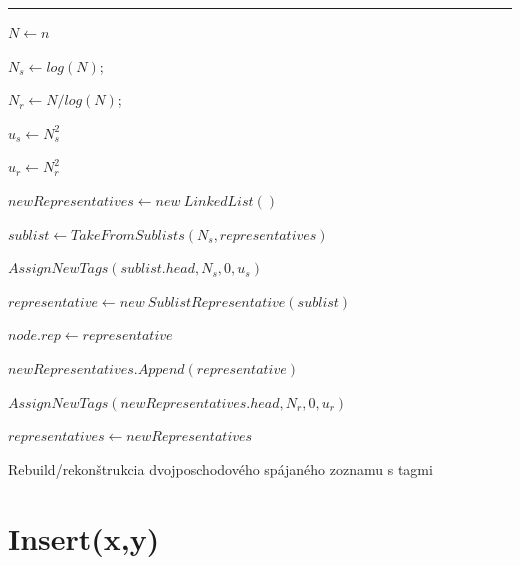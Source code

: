 \documentclass[
  digital,     %
  oneside,     %
  nosansbold,  %
  nocolorbold, %
  lof,         %
  lot,         %
]{fithesis4}
\begin{document}
\begin{algorithm}
\hrule\vspace{0.2em}
$N \leftarrow n$\;

$N_s \leftarrow log(N)$; 

$N_r \leftarrow N/log(N)$; 

$u_s \leftarrow N_s^2$\;

$u_r \leftarrow N_r^2$\;

$newRepresentatives \leftarrow new~LinkedList()$\;

{
    $sublist \leftarrow TakeFromSublists(N_s, representatives)$\;
    

    $AssignNewTags(sublist.head, N_s, 0, u_s)$\;
    
    $representative \leftarrow new~SublistRepresentative(sublist)$\;

    {
        $node.rep \leftarrow representative$\;
    }
    
    $newRepresentatives.Append(representative)$\;
}

$AssignNewTags(newRepresentatives.head, N_r, 0, u_r)$\;

$representatives \leftarrow newRepresentatives$\;

\caption{Rebuild/rekonštrukcia dvojposchodového spájaného zoznamu s tagmi}
\end{algorithm}


\section{Insert(x,y)}
\end{document}
